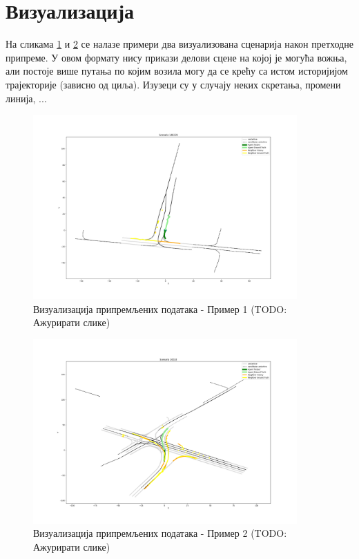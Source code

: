 \documentclass[11pt,oneside]{memoir}
\begin{document}
\section{Визуализација}

На сликама \ref{scenario-example-148229} и \ref{scenario-example-16518} се налазе примери два визуализована сценарија
након претходне припреме. У овом формату нису прикази делови сцене на којој је могућа вожња, али 
постоје више путања по којим возила могу да се крећу са истом историјијом трајекторије (зависно од циља). 
Изузеци су у случају неких скретања, промени линија, ...

\begin{figure}[H]
  \includegraphics[width=0.9\textwidth]{images/scenario_148229.png}
  \caption{Визуализација припремљених података - Пример 1 (TODO: Ажурирати слике)}
  \label{scenario-example-148229}
\end{figure}

\begin{figure}[H]
  \includegraphics[width=0.9\textwidth]{images/scenario_16518.png}
  \caption{Визуализација припремљених података - Пример 2 (TODO: Ажурирати слике)}
  \label{scenario-example-16518}
\end{figure}
\end{document}
